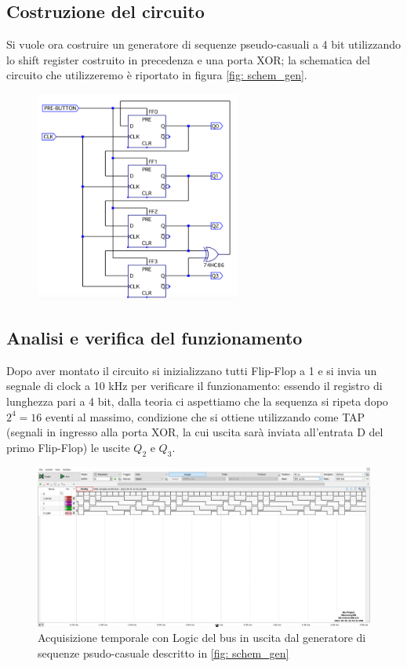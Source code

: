 \documentclass[10pt, a4paper, italian]{article}
\begin{document}
\subsection{Costruzione del circuito}
Si vuole ora costruire un generatore di sequenze pseudo-casuali a 4 bit utilizzando lo shift register costruito in precedenza e una porta XOR; la schematica del circuito che utilizzeremo è riportato in figura \cref{fig: schem_gen}.
\begin{figure}[htbp]
	\includegraphics[width=0.6\textwidth]{schem_gen}
\end{figure}

\subsection{Analisi e verifica del funzionamento}
Dopo aver montato il circuito si inizializzano tutti Flip-Flop a 1 e si invia un segnale di clock a 10 kHz per verificare il funzionamento: 
essendo il registro di lunghezza pari a 4 bit, dalla teoria ci aspettiamo che la sequenza si ripeta dopo $2^4 = 16$ eventi al massimo, condizione che si ottiene utilizzando come TAP (segnali in ingresso alla porta XOR, la cui uscita sarà inviata all'entrata D del primo Flip-Flop) le uscite $Q_2$ e $Q_3$. 

\begin{figure}[htbp]
\centering
	\includegraphics[width=\textwidth]{4.b}
	\caption{\label{fig: TAP_23}Acquisizione temporale con Logic del bus in uscita dal generatore di sequenze psudo-casuale descritto in \cref{fig: schem_gen}}
\end{figure}
\end{document}
